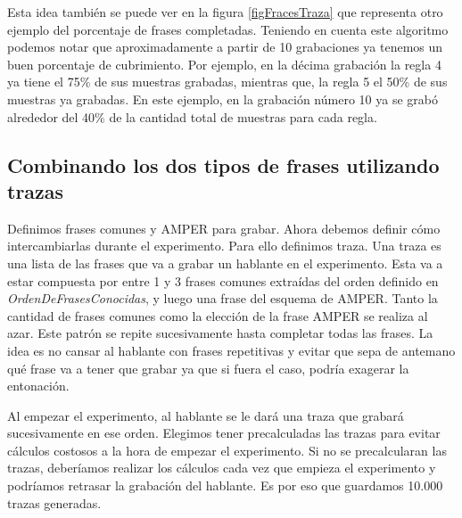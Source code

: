 \normalsize

Esta idea también se puede ver en la figura \ref{figFracesTraza} que representa otro ejemplo del porcentaje de frases completadas. Teniendo en cuenta este algoritmo podemos notar que aproximadamente a partir de 10 grabaciones ya tenemos un buen porcentaje de cubrimiento. Por ejemplo, en la décima grabación la regla 4 ya tiene el 75\% de sus muestras grabadas, mientras que, la regla 5 el 50\% de sus muestras ya grabadas. En este ejemplo, en la grabación número 10 ya se grabó alrededor del 40\% de la cantidad total de muestras para cada regla.


\subsection{Combinando los dos tipos de frases utilizando trazas}

Definimos frases comunes y AMPER para grabar. Ahora debemos definir cómo intercambiarlas durante el experimento. Para ello definimos traza. Una traza es una lista de las frases que va a grabar un hablante en el experimento. Esta va a estar compuesta por entre 1 y 3 frases comunes extraídas del orden definido en \textit{OrdenDeFrasesConocidas}, y luego una frase del esquema de AMPER. Tanto la cantidad de frases comunes como la elección de la frase AMPER se realiza al azar. Este patrón se repite sucesivamente hasta completar todas las frases. La idea es no cansar al hablante con frases repetitivas y evitar que sepa de antemano qué frase va a tener que grabar ya que si fuera el caso, podría exagerar la entonación.

Al empezar el experimento, al hablante se le dará una traza que grabará sucesivamente en ese orden. Elegimos tener precalculadas las trazas para evitar cálculos costosos a la hora de empezar el experimento. Si no se precalcularan las trazas, deberíamos realizar los cálculos cada vez que empieza el experimento y podríamos retrasar la grabación del hablante. Es por eso que guardamos 10.000 trazas generadas. 



